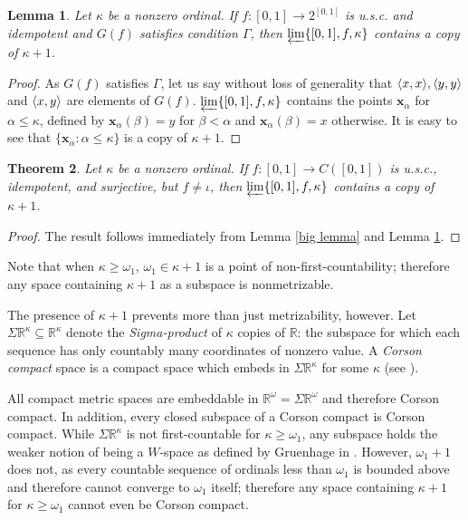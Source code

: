 \documentclass{amsart}
\newtheorem{theorem}{Theorem}[section]
\newtheorem{lemma}[theorem]{Lemma}
\theoremstyle{definition}
\begin{document}
\begin{lemma} \label{general lemma}
Let $\kappa$ be a nonzero ordinal. If $f:[0,1] \to 2^{[0,1]}$ is u.s.c. and idempotent and $G(f)$ satisfies condition $\Gamma$, then $\varprojlim\{[0,1],f,\kappa\}$ contains a copy of $\kappa + 1$.
\end{lemma}

\begin{proof}
As $G(f)$ satisfies $\Gamma$, let us say without loss of generality that $\langle x,x\rangle, \langle y,y\rangle$ and $\langle x,y\rangle$ are elements of $G(f)$. $\varprojlim\{[0,1],f,\kappa\}$ contains the points $\textbf{x}_\alpha$ for $\alpha\leq\kappa$, defined by $\textbf{x}_\alpha(\beta)=y$ for $\beta<\alpha$ and $\textbf{x}_\alpha(\beta)=x$ otherwise. It is easy to see that $\{\textbf{x}_\alpha:\alpha\leq\kappa\}$ is a copy of $\kappa+1$.
\end{proof}

\begin{theorem} \label{main theorem}
Let $\kappa$ be a nonzero ordinal. If $f:[0,1]\to C([0,1])$ is u.s.c., idempotent, and surjective, but $f\not=\iota$, then $\varprojlim\{[0,1],f,\kappa\}$ contains a copy of $\kappa+1$.
\end{theorem}

\begin{proof}
The result follows immediately from Lemma \ref{big lemma} and Lemma \ref{general lemma}.
\end{proof}

Note that when $\kappa\geq\omega_1$, $\omega_1\in\kappa+1$ is a point of non-first-countability; therefore any space containing $\kappa+1$ as a subspace is nonmetrizable.

The presence of $\kappa+1$ prevents more than just metrizability, however. Let $\Sigma\mathbb R^\kappa\subseteq \mathbb R^\kappa$ denote the \textit{Sigma-product} of $\kappa$ copies of $\mathbb R$: the subspace for which each sequence has only countably many coordinates of nonzero value. A \textit{Corson compact} space is a compact space which embeds in $\Sigma\mathbb R^\kappa$ for some $\kappa$ (see \cite{alster}).

All compact metric spaces are embeddable in $\mathbb R^\omega=\Sigma\mathbb R^\omega$ and therefore Corson compact. In addition, every closed subspace of a Corson compact is Corson compact. While $\Sigma\mathbb R^\kappa$ is not first-countable for $\kappa\geq\omega_1$, any subspace holds the weaker notion of being a $W$-space as defined by Gruenhage in \cite{gruenhage}. However, $\omega_1+1$ does not, as every countable sequence of ordinals less than $\omega_1$ is bounded above and therefore cannot converge to $\omega_1$ itself; therefore any space containing $\kappa+1$ for $\kappa\geq\omega_1$ cannot even be Corson compact.
\end{document}
